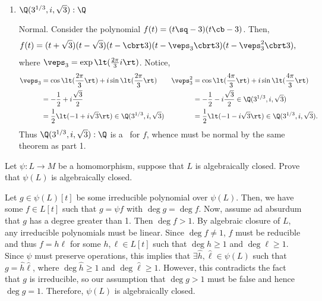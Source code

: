 \documentclass{article}
\begin{document}
\begin{enumerate}
\item \( \Q(3^{1/3},i,\sqrt 3):\Q \) %
\begin{solution}
Normal.
Consider the polynomial \( f(t) = (t\sq-3)(t\cb-3) \).
Then, \begin{align*}
  f(t) &= (t+\sqrt 3)(t-\sqrt 3)(t-\cbrt 3)(t-\veps_3\cbrt 3)(t-\veps_3^2\cbrt 3),
\end{align*}
where \( \veps_3 = \exp\lt(\frac{2\pi}{3}i\rt) \).
Notice, \begin{align*}
  \veps_3 &= \cos\lt(\frac{2\pi}{3}\rt) + i\sin\lt(\frac{2\pi}{3}\rt)    & \veps_3^2 &= \cos\lt(\frac{4\pi}{3}\rt) + i\sin\lt(\frac{4\pi}{3}\rt) \\
          &= -\frac{1}{2}+i\frac{\sqrt 3}{2} & &= -\frac{1}{2}-i\frac{\sqrt 3}{2}\in \Q(3^{1/3},i,\sqrt 3) \\
          &= \frac{1}{2}\lt(-1+i\sqrt 3\rt)\in \Q(3^{1/3},i,\sqrt 3) & &= \frac{1}{2}\lt(-1-i\sqrt 3\rt) \in \Q(3^{1/3},i,\sqrt 3).
\end{align*}
Thus \( \Q(3^{1/3},i,\sqrt 3):\Q \) is a \sfe~for \( f \), whence must be normal by the same theorem as part 1.
\end{solution}
\end{enumerate}

\begin{exercise} %
  Let \( \psi:L \to M \) be a homomorphism, suppose that \( L \) is algebraically closed.
  Prove that \( \psi(L) \) is algebraically closed.
\end{exercise}
\begin{solution}
  Let \( g\in \psi(L)[t] \) be some irreducible polynomial over \( \psi(L) \).
  Then, we have some \( f \in L[t] \) such that \( g=\psi f \) with \( \deg g = \deg f \).
  Now, assume ad absurdum that \( g \) has a degree greater than 1.
  Then \( \deg f > 1 \).
  By algebraic closure of \( L \), any irreducible polynomials must be linear.
  Since \( \deg f \neq 1 \), \( f \) must be reducible and thus \( f = h\ell \) for some \( h,\ell\in L[t] \) such that \( \deg h \geq 1 \) and \( \deg \ell \geq 1 \).
  Since \( \psi \) must preserve operations, this implies that \( \exists \hat h,\hat \ell\in \psi(L) \) such that \( g=\hat h\hat \ell \), where \( \deg \hat h \geq 1 \) and \( \deg\hat\ell \geq 1 \).
  However, this contradicts the fact that \( g \) is irreducible, so our assumption that \( \deg g > 1 \) must be false and hence \( \deg g = 1 \).
  Therefore, \( \psi(L) \) is algebraically closed.
\end{solution}
\end{document}

